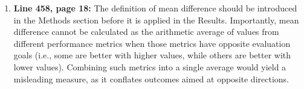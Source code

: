 \documentclass[12pt,letterpaper]{article}
\begin{document}
\begin{enumerate}
The Statistical Analysis subsection (Section II.H) has been updated to explicitly state that ANOVA followed by Tukey’s HSD was used whenever multiple model comparisons were performed. In addition, multiplicity-adjusted post-hoc comparisons for robustness and perturbation experiments are provided in the Supplementary Material and clearly referenced in the revised manuscript.

We confirm that all reported multiple comparisons throughout the manuscript now consistently apply multiplicity correction to control the family-wise error rate.


    




















    
    
    
    
    
    \item \textbf{Line 458, page 18:} The definition of mean difference should be introduced in the Methods section before it is applied in the Results. Importantly, mean difference cannot be calculated as the arithmetic average of values from different performance metrics when those metrics have opposite evaluation goals (i.e., some are better with higher values, while others are better with lower values). Combining such metrics into a single average would yield a misleading measure, as it conflates outcomes aimed at opposite directions.
 


\end{enumerate}
\end{document}
